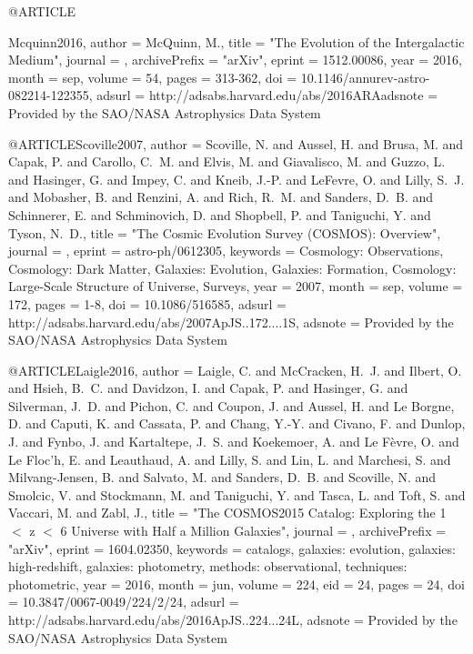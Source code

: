 \documentclass{aa}
\begin{document}
{{{{{{{{{{@ARTICLE{Mcquinn2016,
   author = {{McQuinn}, M.},
    title = "{The Evolution of the Intergalactic Medium}",
  journal = {\araa},
archivePrefix = "arXiv",
   eprint = {1512.00086},
     year = 2016,
    month = sep,
   volume = 54,
    pages = {313-362},
      doi = {10.1146/annurev-astro-082214-122355},
   adsurl = {http://adsabs.harvard.edu/abs/2016ARAadsnote = {Provided by the SAO/NASA Astrophysics Data System}
}

@ARTICLE{Scoville2007,
   author = {{Scoville}, N. and {Aussel}, H. and {Brusa}, M. and {Capak}, P. and 
	{Carollo}, C.~M. and {Elvis}, M. and {Giavalisco}, M. and {Guzzo}, L. and 
	{Hasinger}, G. and {Impey}, C. and {Kneib}, J.-P. and {LeFevre}, O. and 
	{Lilly}, S.~J. and {Mobasher}, B. and {Renzini}, A. and {Rich}, R.~M. and 
	{Sanders}, D.~B. and {Schinnerer}, E. and {Schminovich}, D. and 
	{Shopbell}, P. and {Taniguchi}, Y. and {Tyson}, N.~D.},
    title = "{The Cosmic Evolution Survey (COSMOS): Overview}",
  journal = {\apjs},
   eprint = {astro-ph/0612305},
 keywords = {Cosmology: Observations, Cosmology: Dark Matter, Galaxies: Evolution, Galaxies: Formation, Cosmology: Large-Scale Structure of Universe, Surveys},
     year = 2007,
    month = sep,
   volume = 172,
    pages = {1-8},
      doi = {10.1086/516585},
   adsurl = {http://adsabs.harvard.edu/abs/2007ApJS..172....1S},
  adsnote = {Provided by the SAO/NASA Astrophysics Data System}
}

@ARTICLE{Laigle2016,
   author = {{Laigle}, C. and {McCracken}, H.~J. and {Ilbert}, O. and {Hsieh}, B.~C. and 
	{Davidzon}, I. and {Capak}, P. and {Hasinger}, G. and {Silverman}, J.~D. and 
	{Pichon}, C. and {Coupon}, J. and {Aussel}, H. and {Le Borgne}, D. and 
	{Caputi}, K. and {Cassata}, P. and {Chang}, Y.-Y. and {Civano}, F. and 
	{Dunlop}, J. and {Fynbo}, J. and {Kartaltepe}, J.~S. and {Koekemoer}, A. and 
	{Le F{\`e}vre}, O. and {Le Floc'h}, E. and {Leauthaud}, A. and 
	{Lilly}, S. and {Lin}, L. and {Marchesi}, S. and {Milvang-Jensen}, B. and 
	{Salvato}, M. and {Sanders}, D.~B. and {Scoville}, N. and {Smolcic}, V. and 
	{Stockmann}, M. and {Taniguchi}, Y. and {Tasca}, L. and {Toft}, S. and 
	{Vaccari}, M. and {Zabl}, J.},
    title = "{The COSMOS2015 Catalog: Exploring the 1 $\lt$ z $\lt$ 6 Universe with Half a Million Galaxies}",
  journal = {\apjs},
archivePrefix = "arXiv",
   eprint = {1604.02350},
 keywords = {catalogs, galaxies: evolution, galaxies: high-redshift, galaxies: photometry, methods: observational, techniques: photometric},
     year = 2016,
    month = jun,
   volume = 224,
      eid = {24},
    pages = {24},
      doi = {10.3847/0067-0049/224/2/24},
   adsurl = {http://adsabs.harvard.edu/abs/2016ApJS..224...24L},
  adsnote = {Provided by the SAO/NASA Astrophysics Data System}
}

}}}}}}}}}}}
\end{document}
